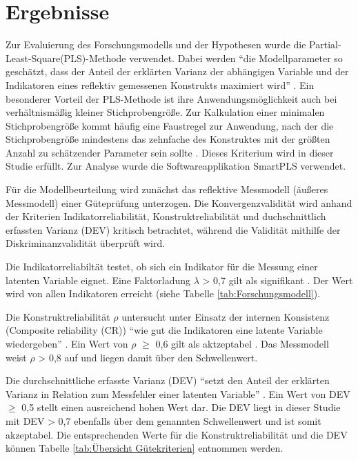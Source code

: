 \section{Ergebnisse}
\label{sec:ergebnisse}
\nocite{lohmoller2013latent}
Zur Evaluierung des Forschungsmodells und der Hypothesen wurde die Partial-Least-Square(PLS)-Methode verwendet. Dabei werden "`die Modellparameter so geschätzt, dass der Anteil der erklärten Varianz der abhängigen Variable und der Indikatoren eines reflektiv gemessenen Konstrukts maximiert wird"' \parencite[S.16]{nitzl2010anwenderorientierte}. Ein besonderer Vorteil der PLS-Methode ist ihre Anwendungsmöglichkeit auch bei verhältnismäßig kleiner Stichprobengröße. Zur Kalkulation einer minimalen Stichprobengröße kommt häufig eine Faustregel zur Anwendung, nach der die Stichprobengröße mindestens das zehnfache des Konstruktes mit der größten Anzahl zu schätzender Parameter sein sollte \parencite[vgl.][S.394]{islam2013investigating}. Dieses Kriterium wird in dieser Studie erfüllt. Zur Analyse wurde die Softwareapplikation SmartPLS verwendet. 

Für die Modellbeurteilung wird zunächst das reflektive Messmodell (äußeres Messmodell) einer Güteprüfung unterzogen. Die Konvergenzvalidität wird anhand der Kriterien Indikatorreliabilität, Konstruktreliabilität und duchschnittlich erfassten Varianz (DEV) kritisch betrachtet, während die Validität mithilfe der Diskriminanzvalidität überprüft wird.

Die Indikatorreliabiltät testet, ob sich ein Indikator für die Messung einer latenten Variable eignet. Eine Faktorladung $\lambda$ > 0,7 gilt als signifikant \parencite[vgl.][S.24]{nitzl2010anwenderorientierte}. Der Wert wird von allen Indikatoren erreicht (siehe Tabelle \ref{tab:Forschungsmodell}). 

Die Konstruktreliabilität $\rho$ untersucht unter Einsatz der internen Konsistenz (Composite reliability (CR)) "`wie gut die Indikatoren eine latente Variable wiedergeben"' \parencite[S.25]{nitzl2010anwenderorientierte}. Ein Wert von $\rho$ $\geq$ 0,6 gilt als aktzeptabel \parencite[vgl.][S.212]{ringle2007beurteilung}. Das Messmodell weist $\rho$ > 0,8 auf und liegen damit über den Schwellenwert.  

Die durchschnittliche erfasste Varianz (DEV) "`setzt den Anteil der erklärten Varianz in Relation zum Messfehler einer latenten Variable"'  \parencite[S.25]{nitzl2010anwenderorientierte}. Ein Wert von DEV $\geq$ 0,5 stellt einen ausreichend hohen Wert dar. Die DEV liegt in dieser Studie mit DEV > 0,7 ebenfalls über dem genannten Schwellenwert und ist somit akzeptabel. Die entsprechenden Werte für die Konstruktreliabilität und die DEV können Tabelle \ref{tab:Übersicht Gütekriterien} entnommen werden.

